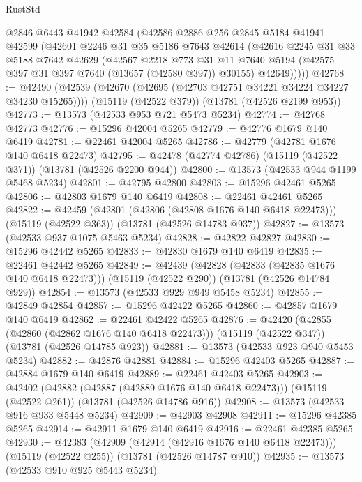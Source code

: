 \begin{lexlean}{RustStd}
\begin{coremodule}
      @2846
      @6443
      @41942
      @42584
      (@42586
        @2886
        @256
        @2845
        @5184
        @41941
        @42599
        (@42601
          @2246
          @31
          @35
          @5186
          @7643
          @42614
          (@42616
            @2245
            @31
            @33
            @5188
            @7642
            @42629
            (@42567
              @2218
              @773
              @31
              @11
              @7640
              @5194
              (@42575 @397 @31 @397 @7640 (@13657 (@42580 @397)) @30155)
              @42649)))))
@42768 := @42490
    (@42539 (@42670 (@42695 (@42703 @42751 @34221 @34224 @34227 @34230 @15265))))
    (@15119 (@42522 @379))
    (@13781 (@42526 @2199 @953))
@42773 := @13573 (@42533 @953 @721 @5473 @5234)
@42774 := @42768 @42773
@42776 := @15296 @42004 @5265
@42779 := @42776 @1679 @140 @6419
@42781 := @22461 @42004 @5265
@42786 := @42779 (@42781 @1676 @140 @6418 @22473)
@42795 := @42478 (@42774 @42786) (@15119 (@42522 @371)) (@13781 (@42526 @2200 @944))
@42800 := @13573 (@42533 @944 @1199 @5468 @5234)
@42801 := @42795 @42800
@42803 := @15296 @42461 @5265
@42806 := @42803 @1679 @140 @6419
@42808 := @22461 @42461 @5265
@42822 := @42459
    (@42801 (@42806 (@42808 @1676 @140 @6418 @22473)))
    (@15119 (@42522 @363))
    (@13781 (@42526 @14783 @937))
@42827 := @13573 (@42533 @937 @1075 @5463 @5234)
@42828 := @42822 @42827
@42830 := @15296 @42442 @5265
@42833 := @42830 @1679 @140 @6419
@42835 := @22461 @42442 @5265
@42849 := @42439
    (@42828 (@42833 (@42835 @1676 @140 @6418 @22473)))
    (@15119 (@42522 @290))
    (@13781 (@42526 @14784 @929))
@42854 := @13573 (@42533 @929 @949 @5458 @5234)
@42855 := @42849 @42854
@42857 := @15296 @42422 @5265
@42860 := @42857 @1679 @140 @6419
@42862 := @22461 @42422 @5265
@42876 := @42420
    (@42855 (@42860 (@42862 @1676 @140 @6418 @22473)))
    (@15119 (@42522 @347))
    (@13781 (@42526 @14785 @923))
@42881 := @13573 (@42533 @923 @940 @5453 @5234)
@42882 := @42876 @42881
@42884 := @15296 @42403 @5265
@42887 := @42884 @1679 @140 @6419
@42889 := @22461 @42403 @5265
@42903 := @42402
    (@42882 (@42887 (@42889 @1676 @140 @6418 @22473)))
    (@15119 (@42522 @261))
    (@13781 (@42526 @14786 @916))
@42908 := @13573 (@42533 @916 @933 @5448 @5234)
@42909 := @42903 @42908
@42911 := @15296 @42385 @5265
@42914 := @42911 @1679 @140 @6419
@42916 := @22461 @42385 @5265
@42930 := @42383
    (@42909 (@42914 (@42916 @1676 @140 @6418 @22473)))
    (@15119 (@42522 @255))
    (@13781 (@42526 @14787 @910))
@42935 := @13573 (@42533 @910 @925 @5443 @5234)

\end{coremodule}
\end{lexlean}
